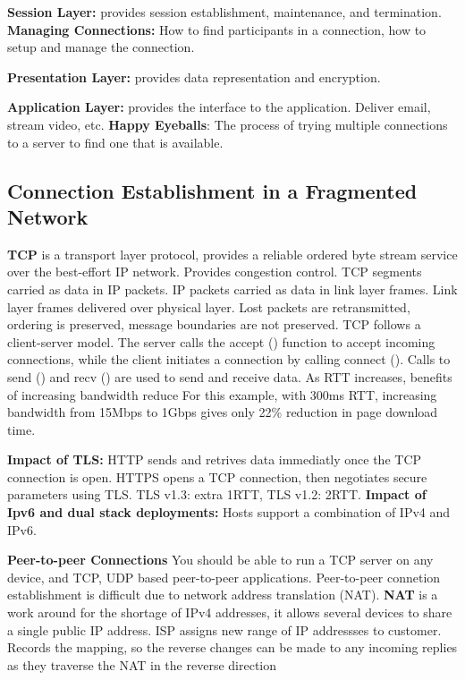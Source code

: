 \documentclass{article}
\begin{document}
\textbf{Session Layer:} provides session establishment, maintenance, and termination.
\textbf{Managing Connections:} How to find participants in a connection, how to setup and manage the connection.

\textbf{Presentation Layer:} provides data representation and encryption.

\textbf{Application Layer:} provides the interface to the application. Deliver email, stream video, etc.
\textbf{Happy Eyeballs}: The process of trying multiple connections to a server to find one that is available.


\subsection*{Connection Establishment in a Fragmented Network}

\textbf{TCP} is a transport layer protocol, provides a reliable ordered byte stream service over the
best-effort IP network. Provides congestion control.
TCP segments carried as data in IP packets.
IP packets carried as data in link layer frames. Link layer frames delivered over physical layer.
Lost packets are retransmitted, ordering is preserved, message boundaries are not preserved.
TCP follows a client-server model.
The server calls the accept () function to accept incoming connections, while the client initiates a connection by calling connect ().
Calls to send () and recv () are used to send and receive data.
As RTT increases, benefits of increasing bandwidth reduce
For this example, with 300ms RTT, increasing bandwidth from 15Mbps to 1Gbps gives only 22\% reduction in page download time.

\textbf{Impact of TLS:}
HTTP sends and retrives data immediatly once the TCP connection is open.
HTTPS opens a TCP connection, then negotiates secure parameters using TLS.\@
TLS v1.3: extra 1RTT, TLS v1.2: 2RTT.\@
\textbf{Impact of Ipv6 and dual stack deployments:}
Hosts support a combination of IPv4 and IPv6.

\textbf{Peer-to-peer Connections}
You should be able to run a TCP server on any device, and TCP, UDP based peer-to-peer applications.
Peer-to-peer connetion establishment is difficult due to network address translation (NAT).
\textbf{NAT} is a work around for the shortage of IPv4 addresses, it allows several devices to share a single public IP address.
ISP assigns new range of IP addressses to customer.
Records the mapping, so the reverse changes can be made to any incoming replies as they traverse the NAT in the reverse direction
\end{document}
